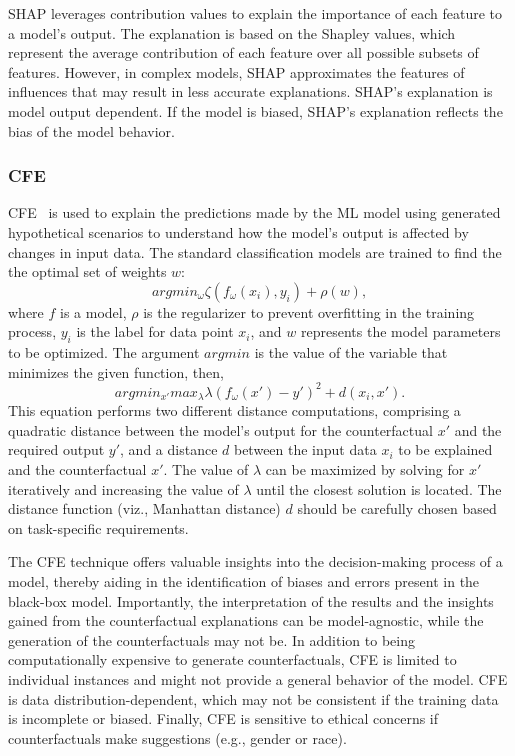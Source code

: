 \documentclass[final,5p,times,twocolumn]{elsarticle}
\begin{document}
SHAP leverages contribution values to explain the importance of each feature to a model's output. The explanation is based on the Shapley values, which represent the average contribution of each feature over all possible subsets of features. 
However, in complex models, SHAP approximates the features of influences that may result in less accurate explanations. SHAP's explanation is model output dependent. If the model is biased, SHAP's explanation reflects the bias of the model behavior. 

\subsubsection{CFE}
CFE~\cite{wachter2017counterfactual} is used to explain the predictions made by the ML model using generated hypothetical scenarios to understand how the model's output is affected by changes in input data. The standard classification models are trained to find the the optimal set of weights $w$: 
\begin{equation}
    argmin_{\omega} \zeta(f_{\omega}(x_{i}), y_{i}) + \rho(w),  
\end{equation}
where $f$ is a model, $\rho$ is the regularizer to prevent overfitting in the training process, $y_{i}$ is the label for data point $x_{i}$, and $w$ represents the model parameters to be optimized. The argument $argmin$ is the value of the variable that minimizes the given function, then,
\begin{equation} 
argmin_{x'} max_{\lambda} \lambda(f_{\omega}(x') - y')^{2} + d(x_{i}, x').    
\end{equation}
This equation performs two different distance computations, comprising a quadratic distance between the model's output for the counterfactual $x'$ and the required output $y'$, and a distance $d$ between the input data $x_i$ to be explained and the counterfactual $x'$. The value of $\lambda$ can be maximized by solving for $x'$ iteratively and increasing the value of $\lambda$ until the closest solution is located. The distance function (viz., Manhattan distance)  $d$ should be carefully chosen based on task-specific requirements.


The CFE technique offers valuable insights into the decision-making process of a model, thereby aiding in the identification of biases and errors present in the black-box model. Importantly, the interpretation of the results and the insights gained from the counterfactual explanations can be model-agnostic, while the generation of the counterfactuals may not be.
In addition to being computationally expensive to generate counterfactuals, CFE is limited to individual instances and might not provide a general behavior of the model. CFE is data distribution-dependent, which may not be consistent if the training data is incomplete or biased. Finally, CFE is sensitive to ethical concerns if counterfactuals make suggestions (e.g., gender or race).
\end{document}
